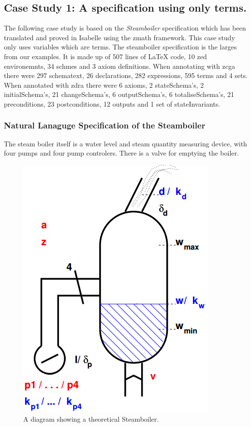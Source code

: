 \subsection{Case Study 1: A specification using only terms.}
\label{subsec:casestudy1}

The following case study is based on the \emph{Steamboiler} \cite{steamboilerslides} specification which has been translated and proved in Isabelle using the \gls{zmath} framework. This case study only uses variables which are terms. The steamboiler specification is the larges from our examples. It is made up of 507 lines of \LaTeX{} code, 10 zed environemnts, 34 schmes and 3 axiom definitions. When annotating with \gls{zcga} there were 297 schematext, 26 declarations, 282 expressions, 595 terms and 4 sets. When annotated with \gls{zdra} there were 6 axioms, 2 stateSchema's, 2 initialSchema's, 21 changeSchema's, 6 outputSchema's, 6 totaliseSchema's, 21 preconditions, 23 postconditions, 12 outputs and 1 set of stateInvariants.

\subsubsection{Natural Lanaguge Specification of the Steamboiler}

The steam boiler itself is a water level and steam quantity measuring device, with four pumps and four pump controlers. There is a valve for emptying the boiler.

\begin{figure}[H]
\centering
\includegraphics[scale=0.5]{Figures/Evaluation/steamboilerimage.png}
\caption{A diagram showing a theoretical Steamboiler. \label{fig:steamboiler}}
\end{figure}

